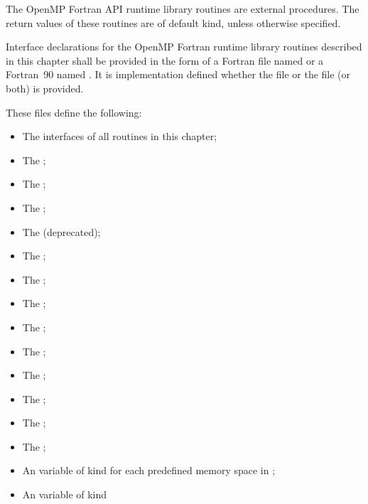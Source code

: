 \begin{fortranspecific}
The OpenMP Fortran API runtime library routines are external procedures. The 
return values of these routines are of default kind, unless otherwise specified.

Interface declarations for the OpenMP Fortran runtime library routines 
described in this chapter shall be provided in the form of a Fortran 
 file named  or a Fortran~90  
named . It is implementation defined whether the
 file or the  file (or both) is provided.

These files define the following:

\begin{itemize}
\item The interfaces of all routines in this chapter;
\item The   ;
\item The   ;
\item The   ;
\item The    (deprecated);
\item The   ;
\item The   ;
\item The   ;
\item The   ;
\item The   ;
\item The   ;
\item The   ;
\item The   ;
\item The   ;
\item An   variable of kind 
       for each predefined memory space 
      in ;
\item An   variable of kind 

\end{itemize}
\end{fortranspecific}
